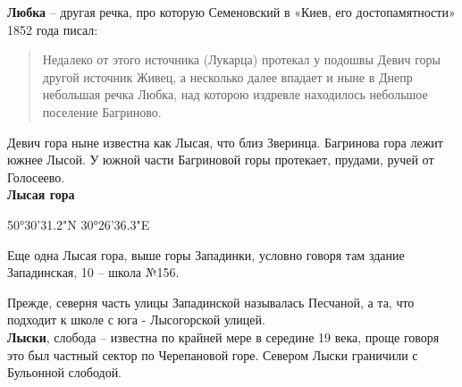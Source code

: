 \textbf{Любка} – другая речка, про которую Семеновский в «Киев, его достопамятности» 1852 года писал:

\begin{quotation}
Недалеко от этого источника (Лукарца) протекал у подошвы Девич горы другой источник Живец, а несколько далее впадает и ныне в Днепр не\-большая речка Любка, над которою издревле находилось небольшое поселение Багриново.
\end{quotation}

Девич гора ныне известна как Лысая, что близ Зверинца. Багринова гора лежит южнее Лысой. У южной части Багриновой горы протекает, прудами, ручей от Голосеево.\\

\textbf{Лысая гора}

50°30'31.2"N 30°26'36.3"E

Еще одна Лысая гора, выше горы Западинки, условно говоря там здание Западинская, 10 – школа  №156.

Прежде, северня часть улицы Западинской называлась Песчаной, а та, что подходит к школе с юга - Лысогорской улицей.\\


\textbf{Лыски}, слобода – известна по крайней мере в середине 19 века, проще говоря это был частный сектор по Черепановой горе. Севером Лыски граничили с Бульонной слободой.\\


